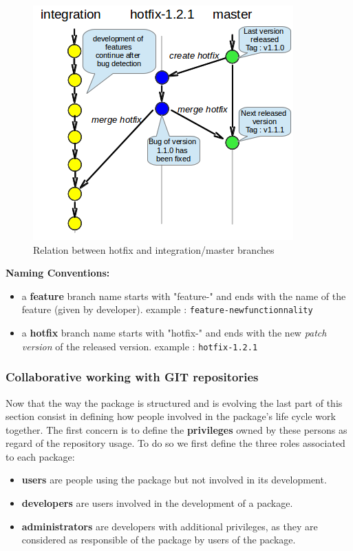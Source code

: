 \documentclass[12pt,a4paper]{article}
\begin{document}
\begin{figure}
\center
\includegraphics[scale=1]{images/hotfix_branching.png}
\caption{Relation between hotfix and integration/master branches}
\label{fig-hotfix-branches}
\end{figure}

\textbf{Naming Conventions:}
\begin{itemize}
\item a \textbf{feature} branch name starts with "feature-" and ends with the name of the feature (given by developer).
\linebreak example : \texttt{feature-newfunctionnality}
\item a \textbf{hotfix} branch name starts with "hotfix-" and ends with the new \textit{patch version} of the released version.
\linebreak example : \texttt{hotfix-1.2.1}
\end{itemize}

\subsubsection{Collaborative working with GIT repositories}
\label{sec:gitrepositories}

Now that the way the package is structured and is evolving the last part of this section consist in defining how people involved in the package's life cycle work together. The first concern is to define the \textbf{privileges} owned by these persons as regard of the repository usage. To do so we first define the three roles associated to each package:
\begin{itemize}
\item \textbf{users} are people using the package but not involved in its development.
\item \textbf{developers} are users involved in the development of a package.
\item \textbf{administrators} are developers with additional privileges, as they are considered as responsible of the package by users of the package.
\end{itemize}
\end{document}
